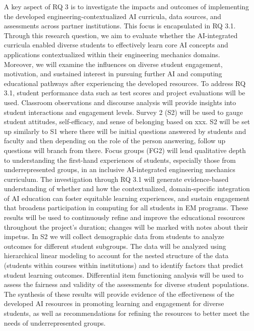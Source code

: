\documentclass[11pt]{article}
\begin{document}
A key aspect of RQ 3 is to investigate the impacts and outcomes of implementing the developed engineering-contextualized AI curricula, data sources, and assessments across partner institutions. This focus is encapsulated in RQ 3.1.
Through this research question, we aim to evaluate whether the AI-integrated curricula enabled diverse students to effectively learn core AI concepts and applications contextualized within their engineering mechanics domains. 
Moreover, we will examine the influences on diverse student engagement, motivation, and sustained interest in pursuing further AI and computing educational pathways after experiencing the developed resources. 
To address RQ 3.1, student performance data such as test scores and project evaluations will be used. Classroom observations and discourse analysis will provide insights into student interactions and engagement levels. 
Survey 2 (S2) will be used to gauge student attitudes, self-efficacy, and sense of belonging based on xxx. 
S2 will be set up similarly to S1 where there will be initial questions answered by students and faculty and then depending on the role of the person answering, follow up questions will branch from there.
Focus groups (FG2) will lend qualitative depth to understanding the first-hand experiences of students, especially those from underrepresented groups, in an inclusive AI-integrated engineering mechanics curriculum.
The investigation through RQ 3.1 will generate evidence-based understanding of whether and how the contextualized, domain-specific integration of AI education can foster equitable learning experiences, and sustain engagement that broadens participation in computing for all students in EM programs.
These results will be used to continuously refine and improve the educational resources throughout the project's duration; changes will be marked with notes about their impetus.
In S2 we will collect demographic data from students to analyze outcomes for different student subgroups. 
The data will be analyzed using hierarchical linear modeling to account for the nested structure of the data (students within courses within institutions) and to identify factors that predict student learning outcomes. 
Differential item functioning analysis will be used to assess the fairness and validity of the assessments for diverse student populations.
The synthesis of these results will provide evidence of the effectiveness of the developed AI resources in promoting learning and engagement for diverse students, as well as recommendations for refining the resources to better meet the needs of underrepresented groups. 
\end{document}
